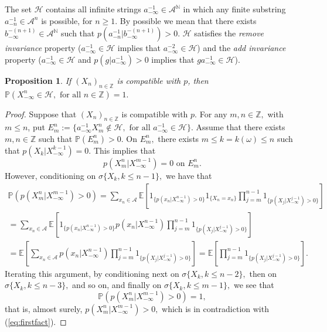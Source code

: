 \documentclass[a4paper]{article}
\newtheorem{proposition}{Proposition}%
\def\P{{\mathbb P}}
\newcommand{\E}{\mathbb{E}}
\newcommand{\Z}{\mathbb{Z}}
\newcommand{\N}{\mathbb{N}}
\renewcommand{\H}{\mathcal{H}}
\newcommand{\A}{\mathcal{A}}
\begin{document}
The set $\H$ contains all infinite strings $a_{-\infty}^{-1} \in \A^{\N}$ in which any finite substring $a_{-n}^{-1} \in \A^{n}$ is possible, for $n\geq1$. By possible we mean that there exists $b_{-\infty}^{-(n+1)} \in \A^{\N}$ such that $p(a_{-n}^{-1}|b_{-\infty}^{-(n+1)})>0$. $\H$ satisfies the \textit{remove invariance} property ($a_{-\infty}^{-1} \in \H$ implies that $a_{-\infty}^{-2} \in \H$) and the \textit{add invariance} property ($a_{-\infty}^{-1} \in \H$ and $p(g|a_{-\infty}^{-1})>0$ implies that $ga_{-\infty}^{-1} \in \H$). 


\begin{proposition} \label{prop:admissiblehistories} If $(X_n)_{n\in \Z}$ is compatible with $p$, then $
\P(X_{-\infty}^{n} \in \H, \text{ for all } n\in \Z)=1.
$
    
\end{proposition}
\begin{proof}
Suppose that $(X_n)_{n\in \Z}$ is compatible with $p.$ For any $ m, n \in \Z,$ with $m\leq n$, put $E_m^n :=\{a_{-\infty}^{-1} X_{m}^{n} \not\in \H, \text{ for all }a_{-\infty}^{-1}\in \H\} .$ 
Assume that there exists $m,n\in \Z$ such that $\P (E_m^n) > 0. $ On $E_m^n, $ there exists $m\leq k= k ( \omega ) \leq n$ such that $p(X_k|X_{-\infty}^{k-1})=0.$ This implies that 
\begin{equation}\label{eq:firstfact}
p( X_m^{n}| X_{- \infty}^{m-1} ) = 0 \mbox{ on } E_m^n.
\end{equation} 
However, conditioning on $\sigma \{ X_k, k \le n-1 \},$  we have that 
\begin{multline*}
\P ( p( X_m^{n}| X_{- \infty}^{m-1} ) > 0 ) = \sum_{x_n \in \A} \E [ 1_{\{ p ( x_n |X_{- \infty}^{n-1} ) > 0 \}} 1_{\{ X_n = x_n \}}\prod_{j=m}^{n-1} 1_{\{ p ( X_j |X_{- \infty}^{j-1} ) > 0 \}}  ]  \\
=\sum_{x_n \in \A} \E [1_{\{ p ( x_n |X_{- \infty}^{n-1} ) > 0 \}}  p(x_n|X_{- \infty}^{n-1}) \prod_{j=m}^{n-1} 1_{\{ p ( X_j |X_{- \infty}^{j-1} ) > 0 \}}  ]  \\
= \E [ \sum_{x_n \in \A} p(x_n|X_{- \infty}^{n-1}) \prod_{j=m}^{n-1} 1_{\{ p ( X_j |X_{- \infty}^{j-1} ) > 0 \}}  ]  =  \E [  \prod_{j=m}^{n-1} 1_{\{ p ( X_j |X_{- \infty}^{j-1} ) > 0 \}}  ]  .
\end{multline*}
Iterating this argument, by conditioning next on $\sigma \{ X_k, k \le n-2 \},$ then on $\sigma \{ X_k, k \le n-3 \},$ and so on, and finally on $ \sigma \{ X_k, k \le m-1 \} , $
we see that 
$$ \P ( p( X_m^{n}| X_{- \infty}^{m-1} ) > 0 ) = 1 , $$ that is, almost surely, $p( X_m^{n}| X_{- \infty}^{m-1} ) > 0 ,$ which is in contradiction with (\ref{eq:firstfact}).    
\end{proof}
\end{document}
